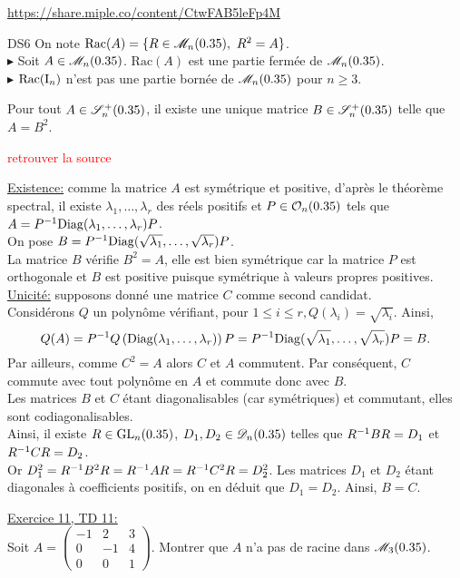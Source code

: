 \url{https://share.miple.co/content/CtwFAB5leFp4M}

\begin{box_titre}{DS6}
    On note $\mathrm{Rac}(A) = \{ R \in \mathscr{M}_n(0.35),\ R^2 = A \}$. \\
    $\blacktriangleright$ Soit $A \in \mathscr{M}_n(0.35)$. $\mathrm{Rac}(A)$ est une partie fermée de $\mathscr{M}_n(0.35)$. \\
    $\blacktriangleright$ $\mathrm{Rac}(\mathrm{I}_n)$ n'est pas une partie bornée de $\mathscr{M}_n(0.35)$ pour $n \geqslant 3$. 
\end{box_titre}

\begin{prop}{}
    Pour tout $A \in \mathscr{S}_n^+(0.35)$, il existe une unique matrice $B \in \mathscr{S}_n^+(0.35)$ telle que $A = B^2$. 
\end{prop}
\textcolor{red}{retrouver la source}
\begin{preuve}
    \underline{Existence:} comme la matrice $A$ est symétrique et positive, d'après le théorème spectral, il existe $\lambda_1, \dots, \lambda_r$ des réels positifs et $P \in \mathcal{O}_n(0.35)$ tels que $A = P^{-1} \mathrm{Diag}(\lambda_1, \dots, \lambda_r) P$. \\
    On pose $B = P^{-1} \mathrm{Diag}(\sqrt{\lambda_1}, \dots, \sqrt{\lambda_r}) P$. \\
    La matrice $B$ vérifie $B^2 = A$, elle est bien symétrique car la matrice $P$ est orthogonale et $B$ est positive puisque symétrique à valeurs propres positives. \\
    \underline{Unicité:} supposons donné une matrice $C$ comme second candidat. \\
    Considérons $Q$ un polynôme vérifiant, pour $1 \leqslant i \leqslant r, Q(\lambda_i) = \sqrt{\lambda_i}$. Ainsi, 
    $$Q(A) = P^{-1} Q\left(\mathrm{Diag}(\lambda_1, \dots, \lambda_r)\right) P = P^{-1} \mathrm{Diag}(\sqrt{\lambda_1}, \dots, \sqrt{\lambda_r}) P = B.$$
    Par ailleurs, comme $C^2 = A$ alors $C$ et $A$ commutent. Par conséquent, $C$ commute avec tout polynôme en $A$ et commute donc avec $B$. \\
    Les matrices $B$ et $C$ étant diagonalisables (car symétriques) et commutant, elles sont codiagonalisables. \\
    Ainsi, il existe $R \in \mathrm{GL}_n(0.35)$, $D_1, D_2 \in \mathscr{D}_n(0.35)$ telles que $R^{-1}BR = D_1$ et $R^{-1}CR = D_2$. \\
    Or $D_1^2 = R^{-1} B^2 R = R^{-1} A R = R^{-1} C^2 R = D_2^2$. Les matrices $D_1$ et $D_2$ étant diagonales à coefficients positifs, on en déduit que $D_1 = D_2$. Ainsi, $B = C$.
\end{preuve}

\begin{exercice}
    \underline{Exercice 11, TD 11:}\\
    Soit $A = 
    \begin{pmatrix}
        -1 & 2 & 3 \\
        0 & - 1 & 4 \\
        0 & 0 & 1
    \end{pmatrix}. 
    $ Montrer que $A$ n'a pas de racine dans $\mathscr{M}_3(0.35)$. 
\end{exercice}
